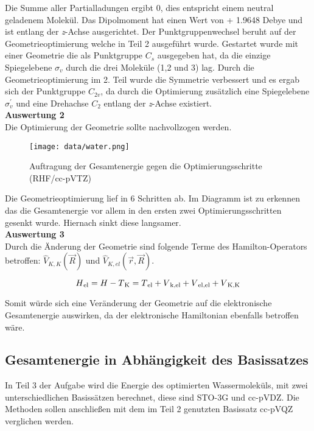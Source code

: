 \documentclass[12pt]{article}
\begin{document}
\begin{onehalfspace}
\begin{table}[htbp]
\begin{tabular}{ll}
\end{tabular}
\end{table}
\noindent
Die Summe aller Partialladungen ergibt 0, 
dies entspricht einem neutral geladenem Molekül. 
Das Dipolmoment hat einen Wert von + 1.9648 Debye und ist entlang der \textit{z}-Achse ausgerichtet. 
Der Punktgruppenwechsel beruht auf der Geometrieoptimierung
welche in Teil 2 ausgeführt wurde. 
Gestartet wurde mit einer Geometrie die als Punktgruppe $C_s$ ausgegeben hat, da die einzige Spiegelebene
$\sigma_v$ durch die drei Moleküle (1,2 und 3) lag. 
Durch die Geometrieoptimierung im 2. Teil wurde die Symmetrie verbessert und es ergab sich der Punktgruppe $C _{2v}$, 
da durch die Optimierung zusätzlich eine Spiegelebene $\sigma_v^{\prime}$ und eine Drehachse $C_2$ entlang der \textit{z}-Achse existiert.\\

\noindent
\textbf{Auswertung 2}\\
Die Optimierung der Geometrie sollte nachvollzogen werden.
\begin{figure}[!htp]
\centering
  \texttt{[image: data/water.png]}%
  \caption{Auftragung der Gesamtenergie gegen die Optimierungsschritte (RHF/cc-pVTZ)}
\end{figure}
\newpage
Die Geometrieoptimierung lief in 6 Schritten ab.
Im Diagramm ist zu erkennen das die Gesamtenergie vor allem 
in den ersten zwei Optimierungsschritten gesenkt wurde. Hiernach sinkt diese langsamer.
\\

\noindent
\textbf{Auswertung 3}\\
Durch die Änderung der Geometrie sind folgende Terme des Hamilton-Operators betroffen: 
$\hat{V} _{K,K}(\vec{R})$ und $\hat{V} _{K,el}(\vec{r},\vec{R})$.

\begin{equation}
 H\textsubscript{el} = H - T\textsubscript{K} = T\textsubscript{el} + V\textsubscript{k,el} + V\textsubscript{el,el} + V\textsubscript{K,K}   
\end{equation}

Somit würde sich eine Veränderung der Geometrie auf die elektronische Gesamtenergie auswirken, da der elektronische Hamiltonian ebenfalls betroffen wäre.

\subsection{Gesamtenergie in Abhängigkeit des Basissatzes}
In Teil 3 der Aufgabe wird die Energie des optimierten Wassermoleküls,
mit zwei unterschiedlichen Basissätzen berechnet, diese sind STO-3G und cc-pVDZ. 
Die Methoden sollen anschließen mit dem im Teil 2 genutzten Basissatz cc-pVQZ verglichen werden.



\end{onehalfspace}
\end{document}
